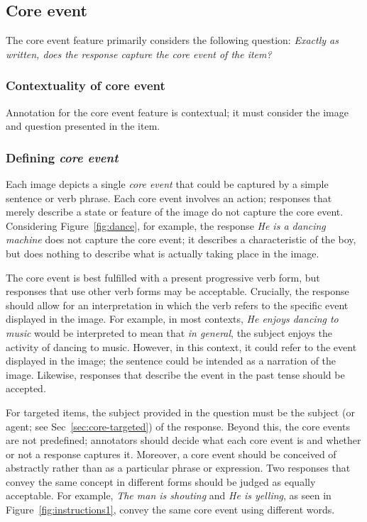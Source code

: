 \documentclass[12pt,notitlepage]{article}
\begin{document}
\subsection{Core event} \label{subsec:core-event}
The core event feature primarily considers the following question: \textit{Exactly as written, does the response capture the core event of the item?}

\subsubsection{Contextuality of core event} Annotation for the core event feature is contextual; it must consider the image and question presented in the item. 

\subsubsection{Defining \textit{core event}}
Each image depicts a single \textit{core event} that could be captured by a simple sentence or verb phrase. Each core event involves an action; responses that merely describe a state or feature of the image do not capture the core event. Considering Figure~\ref{fig:dance}, for example, the response \textit{He is a dancing machine} does not capture the core event; it describes a characteristic of the boy, but does nothing to describe what is actually taking place in the image.

The core event is best fulfilled with a present progressive verb form, but responses that use other verb forms may be acceptable. Crucially, the response should allow for an interpretation in which the verb refers to the specific event displayed in the image. For example, in most contexts, \textit{He enjoys dancing to music} would be interpreted to mean that \textit{in general}, the subject enjoys the activity of dancing to music. However, in this context, it could refer to the event displayed in the image; the sentence could be intended as a narration of the image. Likewise, responses that describe the event in the past tense should be accepted.

For targeted items, the subject provided in the question must be the subject (or agent; see Sec~\ref{sec:core-targeted}) of the response. Beyond this, the core events are not predefined; annotators should decide what each core event is and whether or not a response captures it. Moreover, a core event should be conceived of abstractly rather than as a particular phrase or expression. Two responses that convey the same concept in different forms should be judged as equally acceptable. For example, \textit{The man is shouting} and \textit{He is yelling}, as seen in Figure~\ref{fig:instructions1}, convey the same core event using different words.
\end{document}
